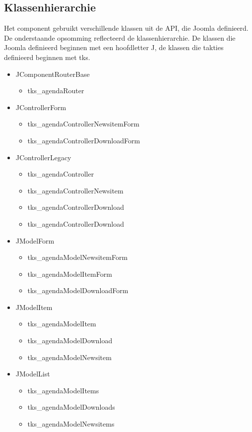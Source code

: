\documentclass{article}
\begin{document}
\newpage
\subsection{Klassenhierarchie}

Het component gebruikt verschillende klassen uit de API, die Joomla definieerd. \\

De onderstaande opsomming reflecteerd de klassenhierarchie. De klassen die Joomla definieerd beginnen met een hoofdletter J, de klassen die takties definieerd beginnen met tks.\\

\begin{itemize}
\item JComponentRouterBase
\begin{itemize}
	\item tks\_agendaRouter
\end{itemize}
\item JControllerForm
\begin{itemize}
	\item tks\_agendaControllerNewsitemForm
	\item tks\_agendaControllerDownloadForm
\end{itemize}
\item JControllerLegacy
\begin{itemize}
	\item tks\_agendaController 
	\item tks\_agendaControllerNewsitem 
	\item tks\_agendaControllerDownload 
	\item tks\_agendaControllerDownload 
\end{itemize}
\item JModelForm
\begin{itemize}
	\item tks\_agendaModelNewsitemForm
	\item tks\_agendaModelItemForm  
	\item tks\_agendaModelDownloadForm
\end{itemize}
\item JModelItem
\begin{itemize}
	\item tks\_agendaModelItem
	\item tks\_agendaModelDownload
	\item tks\_agendaModelNewsitem
\end{itemize}
\item JModelList
\begin{itemize}
	\item tks\_agendaModelItems
	\item tks\_agendaModelDownloads
	\item tks\_agendaModelNewsitems
\end{itemize}
\end{itemize}
\end{document}
